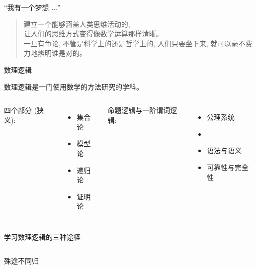 \begin{frame}{}
\end{frame}

\begin{frame}{``我有一个梦想 $\ldots$''}
  \begin{quote}
    建立一个能够涵盖人类思维活动的,\\
    让人们的思维方式变得像数学运算那样清晰。\\[8pt]

    一旦有争论, 不管是科学上的还是哲学上的,
    人们只要坐下来,
    就可以毫不费力地辨明谁是对的。
  \end{quote}

  \vspace{0.80cm}
  \begin{quote}
    \centerline{}
  \end{quote}
\end{frame}

\begin{frame}{数理逻辑}
  \centerline{数理逻辑是一门使用数学的方法研究的学科。}
  \vspace{0.80cm}

  \begin{columns}
    四个部分 (狭义):
      \begin{itemize}
	\item 集合论
	\item 模型论
	\item 递归论
	\item 证明论
      \end{itemize}
    命题逻辑与一阶谓词逻辑:
      \begin{itemize}
	\item 公理系统
	\item {}
	\item 语法与语义
	\item 可靠性与完全性
      \end{itemize}
  \end{columns}
\end{frame}

\begin{frame}{学习数理逻辑的三种途径}
  \begin{columns}
  \end{columns}
\end{frame}

\begin{frame}{殊途不同归}
\end{frame}
